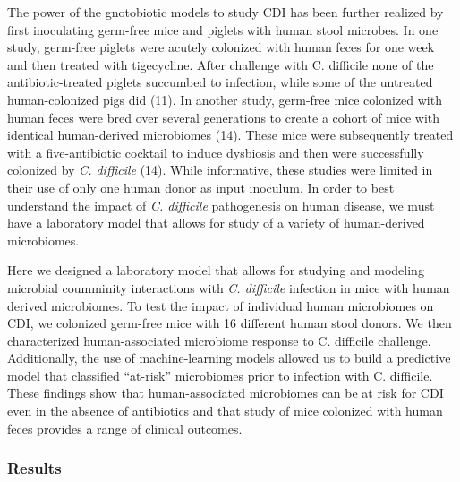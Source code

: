 \documentclass[11pt,]{article}
\begin{document}
The power of the gnotobiotic models to study CDI has been further
realized by first inoculating germ-free mice and piglets with human
stool microbes. In one study, germ-free piglets were acutely colonized
with human feces for one week and then treated with tigecycline. After
challenge with C. difficile none of the antibiotic-treated piglets
succumbed to infection, while some of the untreated human-colonized pigs
did (11). In another study, germ-free mice colonized with human feces
were bred over several generations to create a cohort of mice with
identical human-derived microbiomes (14). These mice were subsequently
treated with a five-antibiotic cocktail to induce dysbiosis and then
were successfully colonized by \emph{C. difficile} (14). While
informative, these studies were limited in their use of only one human
donor as input inoculum. In order to best understand the impact of
\emph{C. difficile} pathogenesis on human disease, we must have a
laboratory model that allows for study of a variety of human-derived
microbiomes.

Here we designed a laboratory model that allows for studying and
modeling microbial coumminity interactions with \emph{C. difficile}
infection in mice with human derived microbiomes. To test the impact of
individual human microbiomes on CDI, we colonized germ-free mice with 16
different human stool donors. We then characterized human-associated
microbiome response to C. difficile challenge. Additionally, the use of
machine-learning models allowed us to build a predictive model that
classified ``at-risk'' microbiomes prior to infection with C. difficile.
These findings show that human-associated microbiomes can be at risk for
CDI even in the absence of antibiotics and that study of mice colonized
with human feces provides a range of clinical outcomes.

\subsubsection{Results}\label{results}
\end{document}
